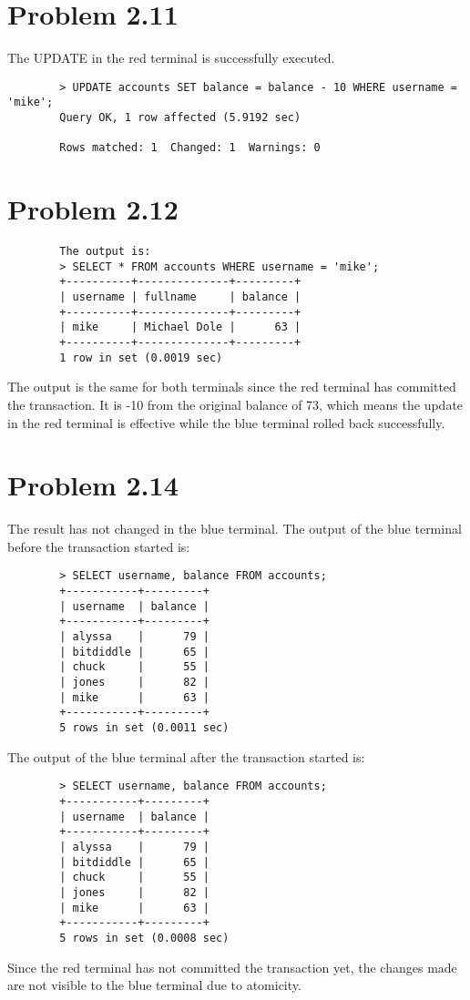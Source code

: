 \documentclass{article}
\begin{document}
\begin{CJK*}{UTF8}{gbsn}
    \section*{Problem 2.11}
    The UPDATE in the red terminal is successfully executed.
    \begin{lstlisting}
        > UPDATE accounts SET balance = balance - 10 WHERE username = 'mike';
        Query OK, 1 row affected (5.9192 sec)

        Rows matched: 1  Changed: 1  Warnings: 0
    \end{lstlisting}
    \section*{Problem 2.12}
    \begin{lstlisting}
        The output is:
        > SELECT * FROM accounts WHERE username = 'mike';
        +----------+--------------+---------+
        | username | fullname     | balance |
        +----------+--------------+---------+
        | mike     | Michael Dole |      63 |
        +----------+--------------+---------+
        1 row in set (0.0019 sec)
    \end{lstlisting}
    The output is the same for both terminals since the red terminal has
    committed the transaction. It is -10 from the original balance of 73, which
    means the update in the red terminal is effective while the blue terminal rolled
    back successfully.
    \section*{Problem 2.14}
    The result has not changed in the blue terminal.
    The output of the blue terminal before the transaction started is:
    \begin{lstlisting}
        > SELECT username, balance FROM accounts;
        +-----------+---------+
        | username  | balance |
        +-----------+---------+
        | alyssa    |      79 |
        | bitdiddle |      65 |
        | chuck     |      55 |
        | jones     |      82 |
        | mike      |      63 |
        +-----------+---------+
        5 rows in set (0.0011 sec)
    \end{lstlisting}
    The output of the blue terminal after the transaction started is:
    \begin{lstlisting}
        > SELECT username, balance FROM accounts;
        +-----------+---------+
        | username  | balance |
        +-----------+---------+
        | alyssa    |      79 |
        | bitdiddle |      65 |
        | chuck     |      55 |
        | jones     |      82 |
        | mike      |      63 |
        +-----------+---------+
        5 rows in set (0.0008 sec)
    \end{lstlisting}
    Since the red terminal has not committed the transaction yet, the changes made
    are not visible to the blue terminal due to atomicity.

\end{CJK*}
\end{document}
